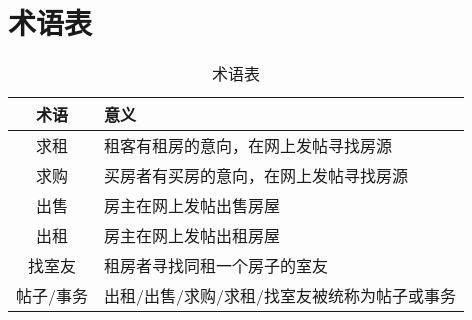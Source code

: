 
\chapter{术语表}

\begin{table}[htbp]
    \small  
    \begin{center}  
    \begin{tabular}{|c|l|}  
    \hline  
    术语 & 意义  \\ \hline  
    求租 & 租客有租房的意向，在网上发帖寻找房源  \\ \hline  
    求购 & 买房者有买房的意向，在网上发帖寻找房源  \\ \hline  
    出售 & 房主在网上发帖出售房屋    \\ \hline  
    出租 & 房主在网上发帖出租房屋  \\ \hline  
    找室友 & 租房者寻找同租一个房子的室友  \\ \hline  
    帖子/事务 & 出租/出售/求购/求租/找室友被统称为帖子或事务  \\ \hline  
    \hline  
    \end{tabular}  
    \end{center}
    \caption{术语表} 
    \end{table}